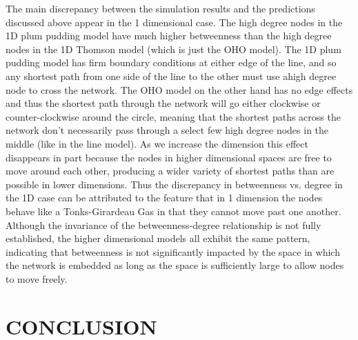 \documentclass[aps,pre,reprint,superscriptaddress,amsmath,amssymb]{revtex4-1}
\begin{document}

The main discrepancy between the simulation results and the predictions discussed above appear in the 1 dimensional case.
The high degree nodes in the 1D plum pudding model have much higher betweenness than the high degree nodes in the 1D Thomson model (which is just the OHO model).
The 1D plum pudding model has firm boundary conditions at either edge of the line, and so any shortest path from one side of the line to the other must use ahigh degree node to cross the network.
The OHO model on the other hand has no edge effects and thus the shortest path through the network will go either clockwise or counter-clockwise around the circle, meaning that the shortest paths across the network don't necessarily pass through a select few high degree nodes in the middle (like in the line model).
As we increase the dimension this effect disappears in part because the nodes in higher dimensional spaces are free to move around each other, producing a wider variety of shortest paths than are possible in lower dimensions. 
Thus the discrepancy in betweenness vs. degree in the 1D case can be attributed to the feature that in 1 dimension the nodes behave like a Tonks-Girardeau Gas in that they cannot move past one another.
Although the invariance of the betweenness-degree relationship is not fully established, the higher dimensional models all exhibit the same pattern, indicating that betweenness is not significantly impacted by the space in which the network is embedded as long as the space is sufficiently large to allow nodes to move freely.

\section{CONCLUSION}


\end{document}
